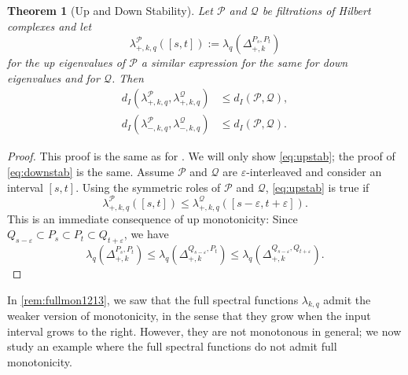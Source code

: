 \documentclass[11pt]{article}
\newtheorem{theorem}{Theorem}[section]
\theoremstyle{definition}
\theoremstyle{remark}
\newcommand{\Pp}{\mathcal{P}}
\newcommand{\Qq}{\mathcal{Q}}
\begin{document}
\begin{theorem}[Up and Down Stability] \label{thm:udstab}
    Let $\Pp$ and $\Qq$ be filtrations of Hilbert complexes and let 
    $$
    \lambda_{+,k,q}^\Pp ([s,t]):=\lambda_q(\Delta_{+,k}^{P_s,P_t})
    $$
    for the up eigenvalues of $\Pp$ a similar expression for the same for down eigenvalues and for $\Qq$. Then
    \begin{align}
        d_I(\lambda_{+,k,q}^\Pp,\lambda_{+,k,q}^\Qq) &\le d_I(\Pp,\Qq), \label{eq:upstab} \\
        d_I(\lambda_{-,k,q}^\Pp,\lambda_{-,k,q}^\Qq) &\le d_I(\Pp,\Qq). \label{eq:downstab}
    \end{align}
\end{theorem}

\begin{proof}
    This proof is the same as for \citep[Theorem 5.9]{mww}. We will only show \cref{eq:upstab}; the proof of \cref{eq:downstab} is the same. Assume $\Pp$ and $\Qq$ are $\varepsilon$-interleaved and consider an interval $[s,t]$. Using the symmetric roles of $\Pp$ and $\Qq$, \cref{eq:upstab} is true if
    $$
        \lambda_{+,k,q}^\Pp ([s,t]) \le \lambda_{+,k,q}^\Qq ([s-\varepsilon,t+\varepsilon]).
    $$
    This is an immediate consequence of up monotonicity: Since $Q_{s-\varepsilon} \subset P_s \subset P_t \subset Q_{t+\varepsilon}$, we have
    $$
        \lambda_q(\Delta_{+,k}^{P_s,P_t}) \le \lambda_q(\Delta_{+,k}^{Q_{s-\varepsilon},P_t}) \le \lambda_q(\Delta_{+,k}^{Q_{s-\varepsilon},Q_{t+\varepsilon}}).
    $$
\end{proof}

In \cref{rem:fullmon1213}, we saw that the full spectral functions $\lambda_{k,q}$ admit the weaker version of monotonicity, in the sense that they grow when the input interval grows to the right. However, they are not monotonous in general; we now study an example where the full spectral functions do not admit full monotonicity.
\end{document}
